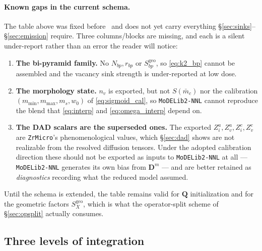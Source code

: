 \documentclass[11pt]{article}
\newcommand{\ZrMicro}{\texttt{ZrMicro}}
\newcommand{\MoDELib}{\texttt{MoDELib2-NNL}}
\begin{document}
\paragraph{Known gaps in the current schema.}
The table above was fixed before~\cite{PoGhoniem2026D1M1} and does not yet carry
everything \S\ref{sec:sinks}--\S\ref{sec:emission} require. Three columns/blocks
are missing, and each is a silent under-report rather than an error the reader
will notice:
\begin{enumerate}[label=(\roman*),leftmargin=1.6em,itemsep=1pt]
\item \textbf{The bi-pyramid family.} No $N_{bp},r_{bp}$ or
$S^{\mathrm{geo}}_{bp}$, so \eqref{eq:k2_bp} cannot be assembled and the vacancy
sink strength is under-reported at low dose.
\item \textbf{The morphology state.} $n_v$ is exported, but not $S(\bar m_c)$ nor
the calibration $(m_{\min},m_{\max},m_s,w_0)$ of \eqref{eq:sigmoid_cal}, so
\MoDELib{} cannot reproduce the blend that \eqref{eq:interp} and
\eqref{eq:omega_interp} depend on.
\item \textbf{The DAD scalars are the superseded ones.} The exported
$Z_i^a,Z_v^a,Z_i^c,Z_v^c$ are \ZrMicro{}'s phenomenological values, which
\S\ref{sec:dad} shows are not realizable from the resolved diffusion tensors.
Under the adopted calibration direction these should not be exported as inputs to
\MoDELib{} at all --- \MoDELib{} generates its own bias from $\mathbf D^m$ ---
and are better retained as \emph{diagnostics} recording what the reduced model
assumed.
\end{enumerate}
Until the schema is extended, the table remains valid for $\mathbf Q$
initialization and for the geometric factors $S^{\mathrm{geo}}_X$, which is what
the operator-split scheme of \S\ref{sec:opsplit} actually consumes.

\subsection{Three levels of integration}
\end{document}
